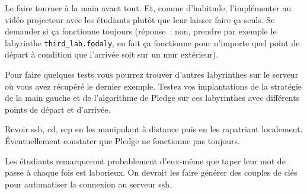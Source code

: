\documentclass[a4paper]{article}
\newenvironment{enseignants}[1]{\noindent\color{blue}{\bf #1}}{}
\begin{document}


\begin{enseignants}{Sur l'algorithme de Pledge~:}
  Le faire tourner à la main avant tout.
  Et, comme d'habitude, l'implémenter au vidéo projecteur avec les étudiants plutôt que leur laisser faire ça seuls.
  Se demander si ça fonctionne toujours (réponse~: non, prendre par exemple le labyrinthe \verb|third_lab.fodaly|, en fait ça fonctionne pour n'importe quel point de départ à condition que l'arrivée soit sur un mur extérieur).
\end{enseignants}

Pour faire quelques tests vous pourrez trouver d'autres labyrinthes sur le serveur où vous avez récupéré le dernier exemple.
Testez vos implantations de la stratégie de la main gauche et de l'algorithme de Pledge sur ces labyrinthes avec différents points de départ et d'arrivée.

\begin{enseignants}{But de ces nouveaux labyrinthes~:}
  Revoir ssh, cd, scp en les manipulant à distance puis en les rapatriant localement.
  Éventuellement constater que Pledge ne fonctionne pas toujours.

    Les étudiants remarqueront probablement d'eux-même que taper leur mot de passe à chaque fois est laborieux. On devrait les faire générer des couples de clés pour automatiser la connexion au serveur ssh.
\end{enseignants}

\end{document}
